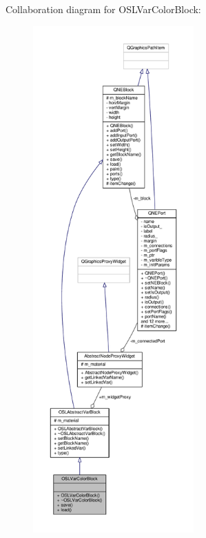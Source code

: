 Collaboration diagram for O\-S\-L\-Var\-Color\-Block\-:
\nopagebreak
\begin{figure}[H]
\begin{center}
\leavevmode
\includegraphics[height=550pt]{class_o_s_l_var_color_block__coll__graph}
\end{center}
\end{figure}

